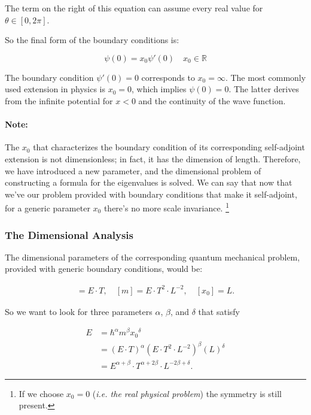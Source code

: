 \noindent
The term on the right of this equation can assume every real value for $\theta \in [0,2\pi]$.

\clearpage
\noindent
So the final form of the boundary conditions is:

\begin{equation} \label{half_BC}
    \psi(0) = x_0 \psi'(0)  \quad x_0 \in \mathbb{R}
\end{equation}

\noindent
The boundary condition \(\psi'(0) = 0\) corresponds to \({x_0} = \infty\). The most commonly used extension in physics is \({x_0} = 0\), which implies \(\psi(0) = 0\). The latter derives from the infinite potential for $x<0$ and the continuity of the wave function.

\paragraph{Note:}
The ${x_0}$ that characterizes the boundary condition of its corresponding self-adjoint extension is not dimensionless; in fact, it has the dimension of length. Therefore, we have introduced a new parameter, and the dimensional problem of constructing a formula for the eigenvalues is solved. We can say that now that we've our problem provided with boundary conditions that make it self-adjoint, for a generic parameter ${x_0}$ there's no more scale invariance.
\footnote{If we choose ${x_0}=0$ (\textit{i.e. the real physical problem}) the symmetry is still present.}

\subsubsection*{The Dimensional Analysis}
The dimensional parameters of the corresponding quantum mechanical problem, provided with generic boundary conditions, would be:

\begin{align*}
    [\hbar] = E \cdot T, \quad [m] = E \cdot T^2 \cdot L^{-2}, \quad [{x_0}] = L.
\end{align*}

\noindent
So we want to look for three parameters $\alpha$, $\beta$, and $\delta$ that satisfy

\begin{align*}
    E & = \hbar^\alpha m^\beta {x_0}^\delta                                      \\
      & = (E \cdot T)^\alpha (E \cdot T^2 \cdot L^{-2})^\beta (L)^\delta           \\
      & = E^{\alpha + \beta} \cdot T^{\alpha + 2\beta} \cdot L^{-2\beta + \delta}.
\end{align*}

